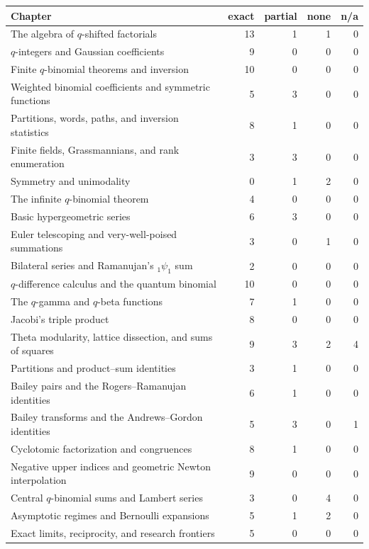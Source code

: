 \documentclass[11pt,a4paper,oneside,openany]{book}
\theoremstyle{definition}
\theoremstyle{remark}
\newcommand{\statusexact}{\textsf{\color{statusgreen}exact}}
\newcommand{\statuspartial}{\textsf{\color{statusamber}partial}}
\newcommand{\statusnone}{\textsf{\color{statusred}none}}
\newcommand{\statusna}{\textsf{n/a}}
\begin{document}
\begin{center}
\begin{tabular}{@{}p{}rrrr@{}}
\toprule
Chapter & \statusexact & \statuspartial & \statusnone & \statusna\\
\midrule
The algebra of $q$-shifted factorials & 13 & 1 & 1 & 0\\
$q$-integers and Gaussian coefficients & 9 & 0 & 0 & 0\\
Finite $q$-binomial theorems and inversion & 10 & 0 & 0 & 0\\
Weighted binomial coefficients and symmetric functions & 5 & 3 & 0 & 0\\
Partitions, words, paths, and inversion statistics & 8 & 1 & 0 & 0\\
Finite fields, Grassmannians, and rank enumeration & 3 & 3 & 0 & 0\\
Symmetry and unimodality & 0 & 1 & 2 & 0\\
The infinite $q$-binomial theorem & 4 & 0 & 0 & 0\\
Basic hypergeometric series & 6 & 3 & 0 & 0\\
Euler telescoping and very-well-poised summations & 3 & 0 & 1 & 0\\
Bilateral series and Ramanujan's \texorpdfstring{${}_1\psi_1$}{1psi1} sum & 2 & 0 & 0 & 0\\
$q$-difference calculus and the quantum binomial & 10 & 0 & 0 & 0\\
The $q$-gamma and $q$-beta functions & 7 & 1 & 0 & 0\\
Jacobi's triple product & 8 & 0 & 0 & 0\\
Theta modularity, lattice dissection, and sums of squares & 9 & 3 & 2 & 4\\
Partitions and product--sum identities & 3 & 1 & 0 & 0\\
Bailey pairs and the Rogers--Ramanujan identities & 6 & 1 & 0 & 0\\
Bailey transforms and the Andrews--Gordon identities & 5 & 3 & 0 & 1\\
Cyclotomic factorization and congruences & 8 & 1 & 0 & 0\\
Negative upper indices and geometric Newton interpolation & 9 & 0 & 0 & 0\\
Central $q$-binomial sums and Lambert series & 3 & 0 & 4 & 0\\
Asymptotic regimes and Bernoulli expansions & 5 & 1 & 2 & 0\\
Exact limits, reciprocity, and research frontiers & 5 & 0 & 0 & 0\\

\end{tabular}
\end{center}
\end{document}
